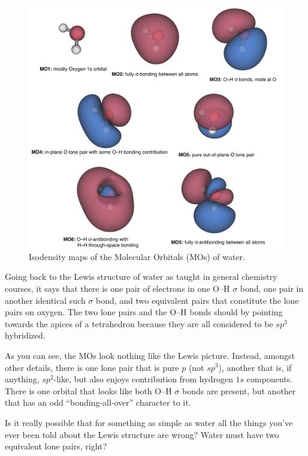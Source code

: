\documentclass[
  9pt,
]{extbook}
\theoremstyle{definition}
\theoremstyle{definition}
\theoremstyle{definition}
\theoremstyle{remark}
\begin{document}
\begin{figure}

{\centering \includegraphics[width=0.9\linewidth]{./img/Fig13} 

}

\caption{Isodensity maps of the Molecular Orbitals (MOs) of water.}\label{fig:Fig1c12b}
\end{figure}

Going back to the Lewis structure of water as taught in general chemistry courses, it says that there is one pair of electrons in one O--H \(\sigma\) bond, one pair in another identical such \(\sigma\) bond, and two equivalent pairs that constitute the lone pairs on oxygen. The two lone pairs and the O--H bonds should by pointing towards the apices of a tetrahedron because they are all considered to be \(sp^3\) hybridized.

As you can see, the MOs look nothing like the Lewis picture. Instead, amongst other details, there is one lone pair that is pure \(p\) (not \(sp^3\)), another that is, if anything, \(sp^2\)-like, but also enjoys contribution from hydrogen \(1s\) components. There is one orbital that looks like both O--H \(\sigma\) bonds are present, but another that has an odd ``bonding-all-over'' character to it.

Is it really possible that for something as simple as water all the things you've ever been told about the Lewis structure are wrong? Water must have two equivalent lone pairs, right?
\end{document}
